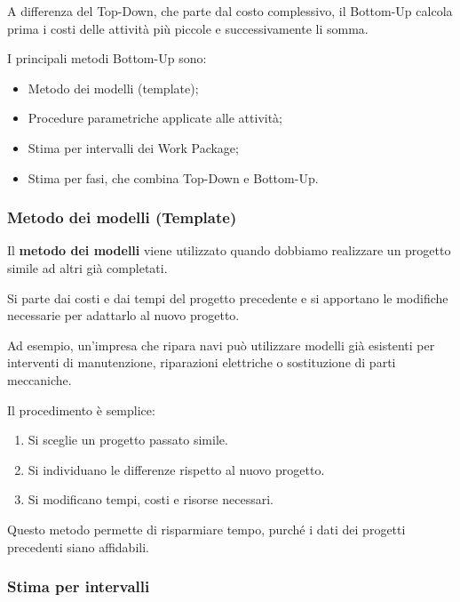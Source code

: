 \noindent A differenza del Top-Down, che parte dal costo
complessivo, il Bottom-Up calcola prima i costi
delle attività più piccole e successivamente li somma.

\medskip

\noindent I principali metodi Bottom-Up sono:

\begin{itemize}
    \item Metodo dei modelli (template);
    \item Procedure parametriche applicate alle attività;
    \item Stima per intervalli dei Work Package;
    \item Stima per fasi, che combina Top-Down e Bottom-Up.
\end{itemize}

\subsubsection*{Metodo dei modelli (Template)}

\noindent Il \textbf{metodo dei modelli} viene utilizzato
quando dobbiamo realizzare un progetto simile
ad altri già completati.

\noindent Si parte dai costi e dai tempi del progetto
precedente e si apportano le modifiche necessarie
per adattarlo al nuovo progetto.

\medskip

\noindent Ad esempio, un'impresa che ripara navi può
utilizzare modelli già esistenti per interventi
di manutenzione, riparazioni elettriche
o sostituzione di parti meccaniche.

\noindent Il procedimento è semplice:

\begin{enumerate}
    \item Si sceglie un progetto passato simile.
    \item Si individuano le differenze rispetto al nuovo progetto.
    \item Si modificano tempi, costi e risorse necessari.
\end{enumerate}

\noindent Questo metodo permette di risparmiare tempo,
purché i dati dei progetti precedenti siano affidabili.

\subsubsection*{Stima per intervalli}

